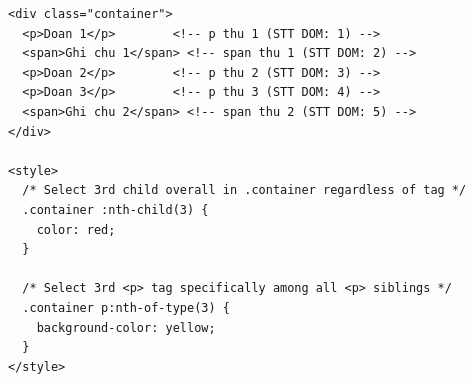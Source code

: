 \documentclass[11pt,oneside]{book}
\newcommand{\thd}[1]{\textcolor{white}{\textbf{\strut #1}}}
\newcommand{\codeinline}[1]{\textcolor{accentOrange}{\texttt{#1}}}
\begin{document}
\begin{codeWindow}
\begin{lstlisting}[language=HTML5]
<div class="container">
  <p>Doan 1</p>        <!-- p thu 1 (STT DOM: 1) -->
  <span>Ghi chu 1</span> <!-- span thu 1 (STT DOM: 2) -->
  <p>Doan 2</p>        <!-- p thu 2 (STT DOM: 3) -->
  <p>Doan 3</p>        <!-- p thu 3 (STT DOM: 4) -->
  <span>Ghi chu 2</span> <!-- span thu 2 (STT DOM: 5) -->
</div>

<style>
  /* Select 3rd child overall in .container regardless of tag */
  .container :nth-child(3) {
    color: red;
  }

  /* Select 3rd <p> tag specifically among all <p> siblings */
  .container p:nth-of-type(3) {
    background-color: yellow;
  }
</style>
\end{lstlisting}
\end{codeWindow}

\begin{prettyTableBox}
\sffamily\small
{}
\end{prettyTableBox}
\end{document}
